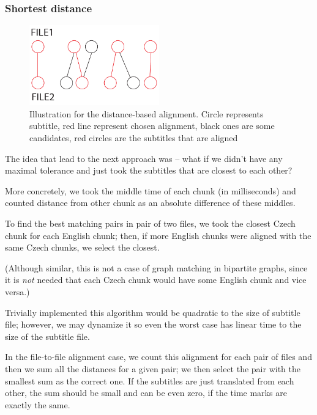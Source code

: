 \subsubsection{Shortest distance}
\begin{figure}[t]
\begin{center}
\includegraphics[width=0.5\textwidth]{figures/distance_align.pdf}
\end{center}
\caption{Illustration for the distance-based alignment. Circle represents subtitle, red line represent chosen alignment, black ones are some candidates, red circles are the subtitles that are aligned}\label{histograms}
\end{figure}

The idea that lead to the next approach was -- what if we didn't have any maximal tolerance and just took the subtitles that are closest to each other?

More concretely, we took the middle time of each chunk (in milliseconds) and counted distance from other chunk as an absolute difference of these middles. 

To find the best matching pairs in pair of two files, we took the closest Czech chunk for each English chunk; then, if more English chunks were aligned with the same Czech chunks, we select the closest.

(Although similar, this is not a case of graph matching in bipartite graphs, since it is \emph{not} needed that each Czech chunk would have some English chunk and vice versa.)

Trivially implemented this algorithm would be quadratic to the size of subtitle file; however, we may dynamize it so even the worst case has linear time to the size of the subtitle file.

In the file-to-file alignment case, we count this alignment for each pair of files and then we sum all the distances for a given pair; we then select the pair with the smallest sum as the correct one. If the subtitles are just translated from each other, the sum should be small and can be even zero, if the time marks are exactly the same.

